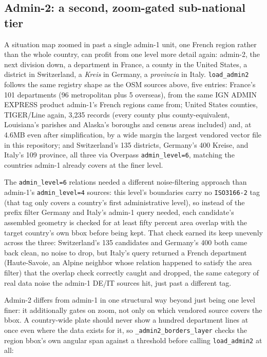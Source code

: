 \documentclass[11pt]{article}
\begin{document}
\subsection{Admin-2: a second, zoom-gated sub-national tier}

A situation map zoomed in past a single admin-1 unit, one French
region rather than the whole country, can profit from one level more
detail again: admin-2, the next division down, a department in France,
a county in the United States, a district in Switzerland, a
\emph{Kreis} in Germany, a \emph{provincia} in Italy.
\texttt{load\_admin2} follows the same registry shape as the OSM
sources above, five entries: France's 101 departments (96 metropolitan
plus 5 overseas), from the same IGN ADMIN EXPRESS product admin-1's
French regions came from; United States counties, TIGER/Line again,
3{,}235 records (every county plus county-equivalent, Louisiana's
parishes and Alaska's boroughs and census areas included) and, at
4.6MB even after simplification, by a wide margin the largest vendored
vector file in this repository; and Switzerland's 135 districts,
Germany's 400 Kreise, and Italy's 109 province, all three via Overpass
\texttt{admin\_level=6}, matching the countries admin-1 already covers
at the finer level.

The \texttt{admin\_level=6} relations needed a different
noise-filtering approach than admin-1's \texttt{admin\_level=4}
sources: this level's boundaries carry no \texttt{ISO3166-2} tag (that
tag only covers a country's first administrative level), so instead of
the prefix filter Germany and Italy's admin-1 query needed, each
candidate's assembled geometry is checked for at least fifty percent
area overlap with the target country's own bbox before being kept.
That check earned its keep unevenly across the three: Switzerland's
135 candidates and Germany's 400 both came back clean, no noise to
drop, but Italy's query returned a French department (Haute-Savoie, an
Alpine neighbor whose relation happened to satisfy the area filter)
that the overlap check correctly caught and dropped, the same category
of real data noise the admin-1 DE/IT sources hit, just past a
different tag.

Admin-2 differs from admin-1 in one structural way beyond just being
one level finer: it additionally gates on zoom, not only on which
vendored source covers the bbox. A country-wide plate should never
show a hundred department lines at once even where the data exists for
it, so \texttt{\_admin2\_borders\_layer} checks the region bbox's own
angular span against a threshold before calling \texttt{load\_admin2}
at all:
\end{document}
